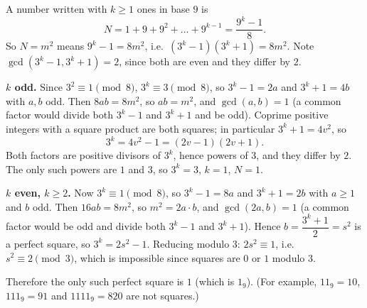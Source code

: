 A number written with $k\ge1$ ones in base $9$ is
\[
N=1+9+9^2+\dots+9^{k-1}=\dfrac{9^k-1}{8}.
\]
So $N=m^2$ means $9^k-1=8m^2$, i.e.\ $(3^k-1)(3^k+1)=8m^2$. Note $\gcd(3^k-1,3^k+1)=2$, since both are even and they differ by $2$.

\textbf{$k$ odd.} Since $3^2\equiv1\pmod8$, $3^k\equiv3\pmod8$, so $3^k-1=2a$ and $3^k+1=4b$ with $a,b$ odd. Then $8ab=8m^2$, so $ab=m^2$, and $\gcd(a,b)=1$ (a common factor would divide both $3^k-1$ and $3^k+1$ and be odd). Coprime positive integers with a square product are both squares; in particular $3^k+1=4v^2$, so
\[
3^k=4v^2-1=(2v-1)(2v+1).
\]
Both factors are positive divisors of $3^k$, hence powers of $3$, and they differ by $2$. The only such powers are $1$ and $3$, so $3^k=3$, $k=1$, $N=1$.

\textbf{$k$ even, $k\ge2$.} Now $3^k\equiv1\pmod8$, so $3^k-1=8a$ and $3^k+1=2b$ with $a\ge1$ and $b$ odd. Then $16ab=8m^2$, so $m^2=2a\cdot b$, and $\gcd(2a,b)=1$ (a common factor would be odd and divide both $3^k-1$ and $3^k+1$). Hence $b=\dfrac{3^k+1}{2}=s^2$ is a perfect square, so $3^k=2s^2-1$. Reducing modulo $3$: $2s^2\equiv1$, i.e.\ $s^2\equiv2\pmod3$, which is impossible since squares are $0$ or $1$ modulo $3$.

Therefore the only such perfect square is $\boxed{1}$ (which is $1_9$). (For example, $11_9=10$, $111_9=91$ and $1111_9=820$ are not squares.)
